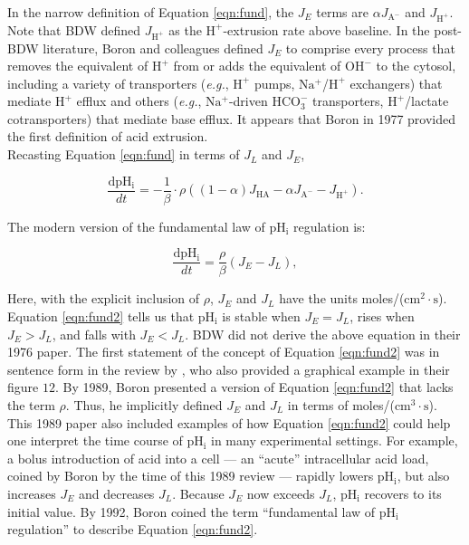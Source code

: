 \documentclass[fleqn,10pt]{physiome}
\begin{document}
In the narrow definition of Equation \ref{eqn:fund}, the $J_E$ terms are $\alpha J_\mathrm{A^-}$ and $J_\mathrm{H^+}$. Note that BDW defined $J_\mathrm{H^+}$ as the $\mathrm{H^+}$-extrusion rate above baseline. In the post-BDW literature, Boron and colleagues defined $J_E$ to comprise every process that removes the equivalent of $\mathrm{H^+}$ from or adds the equivalent of $\mathrm{OH^-}$ to the cytosol, including a variety of transporters (\emph{e.g.}, $\mathrm{H^+}$ pumps, $\mathrm{Na^+}$/$\mathrm{H^+}$ exchangers) that mediate $\mathrm{H^+}$ efflux and others (\emph{e.g.}, $\mathrm{Na^+}$-driven $\mathrm{HCO_3^-}$ transporters, $\mathrm{H^+}$/lactate cotransporters) that mediate base efflux. It appears that Boron in 1977 provided the first definition of acid extrusion.\\

Recasting Equation \ref{eqn:fund} in terms of $J_L$ and $J_E$,

\begin{equation}
\dfrac{\mathrm{dpH_i}}{dt}=-\dfrac{1}{\beta}\cdot \rho\left((1-\alpha)J_\mathrm{HA}-\alpha J_\mathrm{A^-}-J_\mathrm{H^+}\right).
\label{eqn:fund1}
\end{equation}

The modern version of the fundamental law of $\mathrm{pH_i}$ regulation is:
  
\begin{equation}
\dfrac{\mathrm{dpH_i}}{dt}=\dfrac{\rho}{\beta}(J_E-J_L),
\label{eqn:fund2}
\end{equation}

Here, with the explicit inclusion of $\rho$, $J_E$ and $J_L$ have the units moles/($\mathrm{cm^2\cdot s}$).\\

Equation \ref{eqn:fund2} tells us that $\mathrm{pH_i}$ is stable when $J_E=J_L$, rises when $J_E>J_L$, and falls with $J_E<J_L$. BDW did not derive the above equation in their 1976 paper. The first statement of the concept of Equation \ref{eqn:fund2} was in sentence form in the review by \cite{roos1981intracellular}, who also provided a graphical example in their figure $12$. By 1989, Boron presented a version of Equation \ref{eqn:fund2} that lacks the term $\rho$. Thus, he implicitly defined $J_E$ and $J_L$ in terms of moles/($\mathrm{cm^3\cdot s}$). This 1989 paper also included examples of how Equation \ref{eqn:fund2} could help one interpret the time course of $\mathrm{pH_i}$ in many experimental settings. For example, a bolus introduction of acid into a cell --- an ``acute'' intracellular acid load, coined by Boron by the time of this 1989 review --- rapidly lowers $\mathrm{pH_i}$, but also increases $J_E$ and decreases $J_L$. Because $J_E$ now exceeds $J_L$, $\mathrm{pH_i}$ recovers to its initial value. By 1992, Boron coined the term ``fundamental law of $\mathrm{pH_i}$ regulation'' to describe Equation \ref{eqn:fund2}.\\
\end{document}
